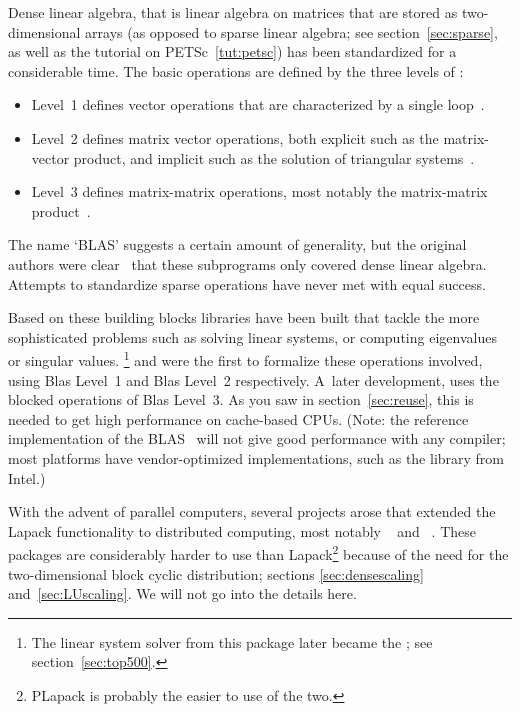 Dense linear algebra, that is linear algebra on matrices that are
stored as two-dimensional arrays (as opposed to sparse linear algebra;
see section~\ref{sec:sparse}, as well as the
tutorial on PETSc~\ref{tut:petsc}) has been standardized for a
considerable time. The basic operations are defined by the three
levels of :
\begin{itemize}
\item Level~1 defines vector operations that are characterized by a
  single loop~\cite{Lawson:blas}.
\item Level~2 defines matrix vector operations, both explicit such as
  the matrix-vector product, and implicit such as the solution of
  triangular systems~\cite{BLAS2}.
\item Level~3 defines matrix-matrix operations, most notably the
  matrix-matrix product~\cite{BLAS3}.
\end{itemize}
The name `BLAS' suggests a certain amount of generality, but the
original authors were clear~\cite{Lawson:blas} that these subprograms
only covered dense linear algebra. Attempts to standardize sparse
operations have never met with equal success.

Based on these building blocks libraries have been built that tackle
the more sophisticated problems such as solving linear systems, or
computing eigenvalues or singular values.
\footnote{The linear system solver from this
  package later became the ; see
  section~\ref{sec:top500}.} and  were the first to formalize
these operations involved, using Blas Level~1 and Blas Level~2
respectively.  A~later development,  uses the
blocked operations of Blas Level~3. As you saw in
section~\ref{sec:reuse}, this is needed to get high performance on
cache-based CPUs. (Note: the reference implementation of the
BLAS~\cite{reference-blas} will not give good performance with any
compiler; most platforms have vendor-optimized implementations, such
as the  library from Intel.)

With the advent of parallel computers, several projects arose that
extended the Lapack functionality to distributed computing, most
notably ~\cite{Choi:scalapack,scalapack-users-guide} and
~\cite{PLAPACK,PLAPACK:UG}. These packages are
considerably harder to use than Lapack\footnote{PLapack is probably
  the easier to use of the two.} because of the need for the
two-dimensional block cyclic distribution; sections
\ref{sec:densescaling} and~\ref{sec:LUscaling}. We will not go into
the details here.

